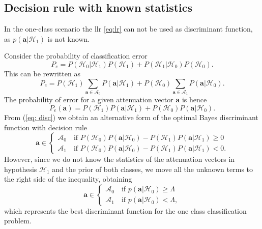 \documentclass[draftcls,onecolumn,12pt]{IEEEtran}
\begin{document}
\subsection{Decision rule with known statistics}\label{sec:oneClassOpt}
In the one-class scenario the \ac{llr} \eqref{eq:lr} can not be used as discriminant function, as $p(\bm{a}|\mathcal{H}_1)$ is not known.

Consider the probability of classification error
\begin{equation}
    P_e = P\left(\mathcal{H}_0|\mathcal{H}_1 \right)P\left( \mathcal{H}_1\right)+P\left(\mathcal{H}_1|\mathcal{H}_0 \right)P\left( \mathcal{H}_0\right).
\end{equation}
This can be rewritten as
\begin{equation}
   P_e = P\left( \mathcal{H}_1\right)\sum_{\bm{a} \in \mathcal{A}_0}P\left(\bm{a}|\mathcal{H}_1\right)+P\left( \mathcal{H}_0\right)\sum_{\bm{a} \in \mathcal{A}_1}P\left(\bm{a}|\mathcal{H}_0\right). 
\end{equation}
The probability of error for a given attenuation vector $\bm{a}$ is hence
\begin{equation}\label{eq: disc}
    P_e(\bm{a}) = P\left( \mathcal{H}_1\right)P\left(\bm{a}|\mathcal{H}_1\right)+P\left( \mathcal{H}_0\right)P\left(\bm{a}|\mathcal{H}_0\right).
\end{equation}
From (\ref{eq: disc}) we obtain an alternative form of the optimal Bayes discriminant function with decision rule
\begin{equation}
    \bm{a} \in 
    \begin{cases}
    \mathcal{A}_0 \quad \text{if } P\left( \mathcal{H}_0\right)P\left(\bm{a}|\mathcal{H}_0\right)-P\left( \mathcal{H}_1\right)P\left(\bm{a}|\mathcal{H}_1\right) \geq 0 \\
\mathcal{A}_1 \quad \text{if }
P\left( \mathcal{H}_0\right)P\left(\bm{a}|\mathcal{H}_0\right)-P\left( \mathcal{H}_1\right)P\left(\bm{a}|\mathcal{H}_1\right) < 0. 
    \end{cases}
\end{equation}
However, since we do not know the statistics of the attenuation vectors in hypothesis $\mathcal{H}_1$ and the prior of both classes, we move all the unknown terms to the right side of the inequality, obtaining  
\begin{equation}
\label{eq:oneClassDec}
\bm{a} \in
\begin{cases}
\mathcal{A}_0 \quad \text{if } p(\bm{a}|\mathcal{H}_0) \geq \Lambda \\
\mathcal{A}_1 \quad \text{if } p(\bm{a}|\mathcal{H}_0) < \Lambda,
\end{cases}
\end{equation}
which represents the best discriminant function for the one class classification problem.
\end{document}
